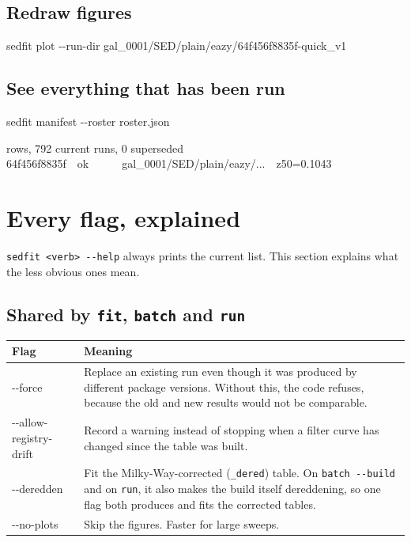 \documentclass[11pt]{article}
\begin{document}
\subsection{Redraw figures}

\begin{cmd}\ttfamily
sedfit plot -{}-run-dir gal\_0001/SED/plain/eazy/64f456f8835f-quick\_v1
\end{cmd}

\subsection{See everything that has been run}

\begin{cmd}\ttfamily
sedfit manifest -{}-roster roster.json
\end{cmd}

\begin{cmd} rows, 792 current runs, 0 superseded\\
\hspace*{2em}64f456f8835f~~ok~~~~~~gal\_0001/SED/plain/eazy/...~~z50=0.1043
\end{cmd}

\section{Every flag, explained}

\texttt{sedfit <verb> -{}-help} always prints the current list. This
section explains what the less obvious ones mean.

\subsection{Shared by \texttt{fit}, \texttt{batch} and \texttt{run}}

\begin{longtable}{>{\ttfamily}l p{9.4cm}}
\toprule
\textbf{\normalfont Flag} & \textbf{Meaning} \\
\midrule
\endhead
-{}-force & Replace an existing run even though it was produced by
  different package versions. Without this, the code refuses, because the
  old and new results would not be comparable. \\
-{}-allow-registry-drift & Record a warning instead of stopping when a
  filter curve has changed since the table was built. \\
-{}-deredden & Fit the Milky-Way-corrected (\texttt{\_dered}) table. On
  \texttt{batch -{}-build} and on \texttt{run}, it also makes the build
  itself dereddening, so one flag both produces and fits the corrected
  tables. \\
-{}-no-plots & Skip the figures. Faster for large sweeps. \\
\bottomrule
\end{longtable}
\end{document}
